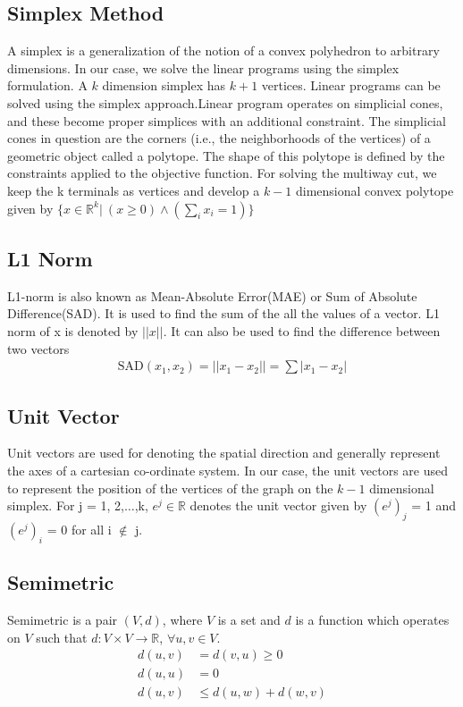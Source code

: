 \documentclass[11pt]{article}
\begin{document}
\subsection{Simplex Method}
A simplex is a generalization of the notion of a convex polyhedron to arbitrary dimensions. In our case, we solve the linear programs using the simplex formulation. A $k$ dimension simplex has $k + 1$ vertices. Linear programs can be solved using the simplex approach.Linear program operates on simplicial cones, and these become proper simplices with an additional constraint. The simplicial cones in question are the corners (i.e., the neighborhoods of the vertices) of a geometric object called a polytope. The shape of this polytope is defined by the constraints applied to the objective function. For solving the multiway cut, we keep the k terminals as vertices and develop a $k-1$ dimensional convex polytope given by $\{x \in {\mathbb R}^k \vert \ (x \ge 0) \wedge (\sum\limits_i x_i = 1) \}$

\subsection{L1 Norm}
L1-norm is also known as Mean-Absolute Error(MAE) or Sum of Absolute Difference(SAD). It is used to find the sum of the all the values of a vector. L1 norm of x is denoted by $\vert\vert x \vert\vert$. It can also be used to find the difference between two vectors
\begin{align*}
\text{SAD}(x_1, x_2) = \vert \vert x_1 - x_2 \vert \vert = \sum \vert x_1 - x_2 \vert
\end{align*}

\subsection{Unit Vector}
Unit vectors are used for denoting the spatial direction and generally represent the axes of a cartesian co-ordinate system. In our case, the unit vectors are used to represent the position of the vertices of the graph on the $k-1$ dimensional simplex. For j = 1, 2,$\dots$,k, $e^j \in \mathbb{R}$ denotes the unit vector given by $(e^j)_j$ = 1 and $(e^j)_i$ = 0 for all i $\notin$ j.

\subsection{Semimetric}
Semimetric is a pair $(V, d)$, where $V$ is a set and $d$ is a function which operates on $V$ such that $d: V \times V \rightarrow \mathbb{R}$, $\forall u,v \in V$.
\begin{align*}
d(u, v) &= d(v, u) \ge 0\\
d(u, u) &= 0\\
d(u,v) &\le d(u,w) + d(w,v) 
\end{align*}
\end{document}
